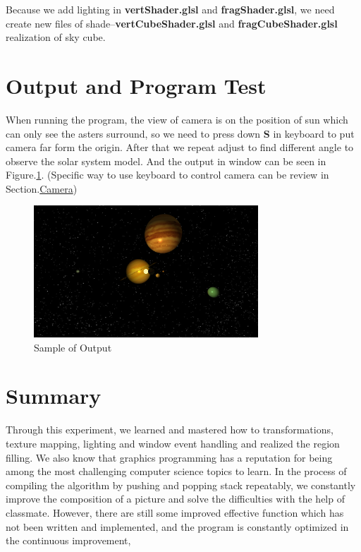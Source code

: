 \documentclass[12pt]{article}
\numberwithin{figure}{subsection}
\numberwithin{table}{subsection}
\numberwithin{equation}{subsection}
\begin{document}

Because we add lighting in \textbf{vertShader.glsl} and \textbf{fragShader.glsl}, 
we need create new files of shade--\textbf{vertCubeShader.glsl} and \textbf{fragCubeShader.glsl} 
realization of sky cube. 

\section{Output and Program Test} 
When running the program, the view of camera is on the position of sun 
which can only see the asters surround,  
so we need to press down \textbf{S} in keyboard to put camera far form the origin. 
After that we repeat adjust to find different angle to observe the solar system model. 
And the output in window can be seen in Figure.\ref{fig:run sample}. 
(Specific way to use keyboard to control camera can be review in Section.\hyperref[sec:camera]{Camera}) 
\begin{figure}[!htbp]
	\centering
	\includegraphics[width=0.75\textwidth]{image/run sample.png}
	\caption{Sample of Output}
    \label{fig:run sample}
\end{figure}
\section{Summary}
Through this experiment, we learned and mastered 
how to transformations, texture mapping, lighting and
window event handling and realized the region filling. 
We also know that graphics programming has a reputation for being among the most challenging
computer science topics to learn. 
In the process of compiling the algorithm by pushing and popping stack repeatably, 
we constantly improve the composition of a picture and solve the difficulties with the help of classmate.
However, there are still some improved effective function which has not been written and implemented, 
and the program is constantly optimized in the continuous improvement, 





\end{document}
